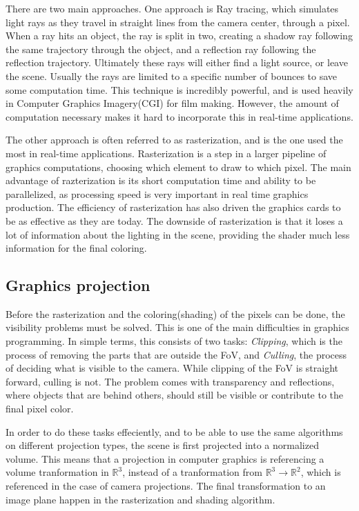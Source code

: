 There are two main approaches. One approach is Ray tracing, which simulates light rays as they travel in straight lines from the camera center, through a pixel. When a ray hits an object, the ray is split in two, creating a shadow ray following the same trajectory through the object, and a reflection ray following the reflection trajectory. Ultimately these rays will either find a light source, or leave the scene. Usually the rays are limited to a specific number of bounces to save some computation time. This technique is incredibly powerful, and is used heavily in Computer Graphics Imagery(CGI) for film making. However, the amount of computation necessary makes it hard to incorporate this in real-time applications.

The other approach is often referred to as rasterization, and is the one used the most in real-time applications. Rasterization is a step in a larger pipeline of graphics computations, choosing which element to draw to which pixel. The main advantage of razterization is its short computation time and ability to be parallelized, as processing speed is very important in real time graphics production. The efficiency of rasterization has also driven the graphics cards to be as effective as they are today. The downside of rasterization is that it loses a lot of information about the lighting in the scene, providing the shader much less information for the final coloring.

\subsection{Graphics projection}

Before the rasterization and the coloring(shading) of the pixels can be done, the visibility problems must be solved. This is one of the main difficulties in graphics programming. In simple terms, this consists of two tasks: \emph{Clipping}, which is the process of removing the parts that are outside the FoV, and \emph{Culling}, the process of deciding what is visible to the camera. While clipping of the FoV is straight forward, culling is not. The problem comes with transparency and reflections, where objects that are behind others, should still be visible or contribute to the final pixel color. 

In order to do these tasks effeciently, and to be able to use the same algorithms on different projection types, the scene is first projected into a normalized volume. This means that a projection in computer graphics is referencing a volume tranformation in $\mathbb{R}^3$, instead of a tranformation from $\mathbb{R}^3 \rightarrow \mathbb{R}^2$, which is referenced in the case of camera projections. The final transformation to an image plane happen in the rasterization and shading algorithm.

